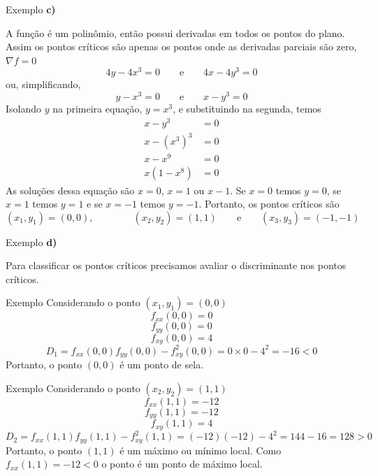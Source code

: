 \begin{frame}{Exemplo \theexemplo}
  \noindent\textbf{c)}

  A função é um polinômio, então possui derivadas em todos os pontos do plano.
  Assim os pontos críticos são apenas os pontos onde as derivadas parciais são zero,
  \(\nabla f = 0\)
  \[
  4y - 4x^3 = 0
  \qquad\text{e}\qquad
  4x -4y^3 = 0
  \]
  ou, simplificando,
  \[
  y - x^3 = 0
  \qquad\text{e}\qquad
  x - y^3 = 0
  \]
  Isolando $y$ na primeira equação, \(y = x^3\), e substituindo na segunda, temos
  \begin{align*}
    x - y^3                & = 0 \\
    x - \left(x^3\right)^3 & = 0 \\
    x -x^9                 & = 0 \\
    x(1 - x^8)             & = 0
  \end{align*}
  As soluções dessa equação são $x=0$, $x=1$ ou $x-1$.
  Se $x=0$ temos $y=0$,
  se $x=1$ temos $y=1$ e
  se $x=-1$ temos $y=-1$.
  Portanto, os pontos críticos são
  \[
  (x_1, y_1) = (0, 0),
  \qquad\qquad
  (x_2, y_2) = (1, 1)
  \qquad\text{e}\qquad
  (x_3, y_3) = (-1, -1)
  \]
\end{frame}

\begin{frame}{Exemplo \theexemplo}
  \noindent\textbf{d)}

  Para classificar os pontos críticos precisamos avaliar o discriminante nos
  pontos críticos.
\end{frame}

\begin{frame}{Exemplo \theexemplo}
  Considerando o ponto \((x_1, y_1) = (0, 0)\)
  \[
  f_{xx}(0, 0) = 0
  \]
  \[
  f_{yy}(0, 0) = 0
  \]
  \[
  f_{xy}(0, 0) = 4
  \]
  \[
  D_1
  = f_{xx}(0, 0)f_{yy}(0, 0) - f^2_{xy}(0, 0)
  = 0 \times 0 - 4^2
  = -16 < 0
  \]
  Portanto, o ponto $(0, 0)$ é um ponto de sela.
\end{frame}

\begin{frame}{Exemplo \theexemplo}
  Considerando o ponto \((x_2, y_2) = (1, 1)\)
  \[
  f_{xx}(1, 1) = -12
  \]
  \[
  f_{yy}(1, 1) = -12
  \]
  \[
  f_{xy}(1, 1) = 4
  \]
  \[
  D_2
  = f_{xx}(1, 1)f_{yy}(1, 1) - f^2_{xy}(1, 1)
  = (-12)(-12) - 4^2
  = 144 -16
  = 128 > 0
  \]
  Portanto, o ponto $(1, 1)$ é um máximo ou mínimo local. Como \(f_{xx}(1, 1) = -12 < 0\)
  o ponto é um ponto de máximo local.
\end{frame}

